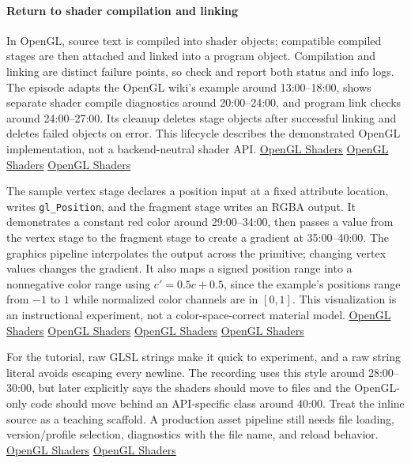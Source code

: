 \paragraph{Return to shader compilation and linking}\label{return-to-shader-compilation-and-linking}

In OpenGL, source text is compiled into shader objects; compatible compiled stages are then attached and linked into a program object. Compilation and linking are distinct failure points, so check and report both status and info logs. The episode adapts the OpenGL wiki's example around 13:00--18:00, shows separate shader compile diagnostics around 20:00--24:00, and program link checks around 24:00--27:00. Its cleanup deletes stage objects after successful linking and deletes failed objects on error. This lifecycle describes the demonstrated OpenGL implementation, not a backend-neutral shader API. \href{https://www.youtube.com/watch?v=QBCCHm_9HV8&t=780s}{OpenGL Shaders} \href{https://www.youtube.com/watch?v=QBCCHm_9HV8&t=1200s}{OpenGL Shaders} \href{https://www.youtube.com/watch?v=QBCCHm_9HV8&t=1440s}{OpenGL Shaders}

The sample vertex stage declares a position input at a fixed attribute location, writes \texttt{gl\_Position}, and the fragment stage writes an RGBA output. It demonstrates a constant red color around 29:00--34:00, then passes a value from the vertex stage to the fragment stage to create a gradient at 35:00--40:00. The graphics pipeline interpolates the output across the primitive; changing vertex values changes the gradient. It also maps a signed position range into a nonnegative color range using \(c'=0.5c+0.5\), since the example's positions range from \(-1\) to \(1\) while normalized color channels are in \([0,1]\). This visualization is an instructional experiment, not a color-space-correct material model. \href{https://www.youtube.com/watch?v=QBCCHm_9HV8&t=1740s}{OpenGL Shaders} \href{https://www.youtube.com/watch?v=QBCCHm_9HV8&t=2040s}{OpenGL Shaders} \href{https://www.youtube.com/watch?v=QBCCHm_9HV8&t=2220s}{OpenGL Shaders} \href{https://www.youtube.com/watch?v=QBCCHm_9HV8&t=2340s}{OpenGL Shaders}

For the tutorial, raw GLSL strings make it quick to experiment, and a raw string literal avoids escaping every newline. The recording uses this style around 28:00--30:00, but later explicitly says the shaders should move to files and the OpenGL-only code should move behind an API-specific class around 40:00. Treat the inline source as a teaching scaffold. A production asset pipeline still needs file loading, version/profile selection, diagnostics with the file name, and reload behavior. \href{https://www.youtube.com/watch?v=QBCCHm_9HV8&t=1680s}{OpenGL Shaders} \href{https://www.youtube.com/watch?v=QBCCHm_9HV8&t=2400s}{OpenGL Shaders}

